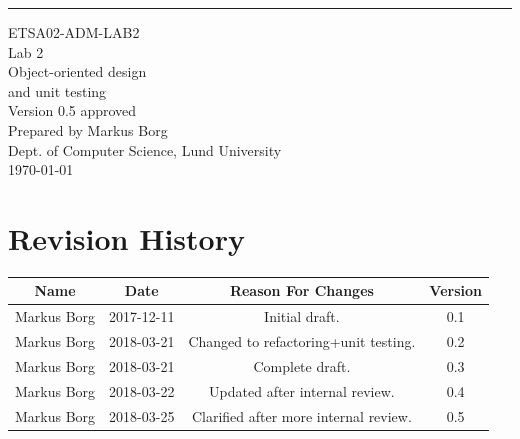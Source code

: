 \documentclass{scrreprt}
\date{}
\def\myversion{0.5 }
\begin{document}
\begin{flushright}
    \rule{16cm}{5pt}\vskip1cm
    \begin{bfseries}
    	\LARGE{ETSA02-ADM-LAB2}\\
    	\vspace{1.5cm}
        \Huge{Lab 2}\\
        \vspace{0.5cm}
        Object-oriented design\\
        \vspace{0.5cm}
        and unit testing\\
        \vspace{1.5cm}
        \LARGE{Version \myversion approved}\\
        \vspace{1.5cm}
        Prepared by Markus Borg\\
        Dept. of Computer Science, Lund University\\
        \vspace{1.5cm}
        \today\\
    \end{bfseries}
\end{flushright}


\chapter*{Revision History}

\begin{center}
    \begin{tabular}{|c|c|c|c|}
        \hline
	    Name & Date & Reason For Changes & Version\\
        \hline
	    Markus Borg & 2017-12-11 & Initial draft. & 0.1\\
        \hline
        Markus Borg & 2018-03-21 & Changed to refactoring+unit testing. & 0.2\\
        \hline
        Markus Borg & 2018-03-21 & Complete draft. & 0.3\\
        \hline
        Markus Borg & 2018-03-22 & Updated after internal review. & 0.4\\
        \hline
        Markus Borg & 2018-03-25 & Clarified after more internal review. & 0.5\\
        \hline
    \end{tabular}
\end{center}
\end{document}
